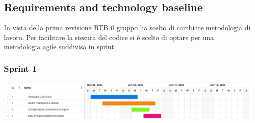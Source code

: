 \subsection{Requirements and technology baseline}
In vista della prima revisione RTB il gruppo ha scelto di cambiare metodologia di lavoro. Per facilitare la stesura del codice si è scelto di optare per una metodologia agile suddivisa in sprint.


\subsubsection{Sprint 1}
\begin{center}
    \includegraphics[scale = 0.4]{./res/img/Sprint_1.png}
  \end{center}

